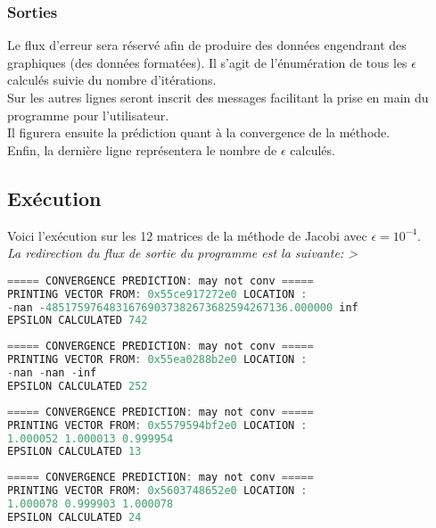 \subsubsection{Sorties}
Le flux d'erreur sera réservé afin de produire des données engendrant des graphiques (des données formatées). Il s'agit de l'énumération de tous les $\epsilon$ calculés suivie du nombre d'itérations. \\
Sur les autres lignes seront inscrit des messages facilitant la prise en main du programme pour l'utilisateur. \\
Il figurera ensuite la prédiction quant à la convergence de la méthode.\\
Enfin, la dernière ligne représentera le nombre de $\epsilon$ calculés. \\
\subsection{Exécution}
Voici l'exécution sur les 12 matrices de la méthode de Jacobi avec $\epsilon=10^{-4}$.\\
\textit{La redirection du flux de sortie du programme est la suivante: >}
\begin{lstlisting}[language=C,inputencoding=utf8, basicstyle=\fontsize{8}{10}\selectfont,caption=Execution with A1 matrix]
 ===== CONVERGENCE PREDICTION: may not conv =====
PRINTING VECTOR FROM: 0x55ce917272e0 LOCATION :
-nan -48517597648316769037382673682594267136.000000 inf
EPSILON CALCULATED 742
\end{lstlisting}
\begin{lstlisting}[language=C,inputencoding=utf8, basicstyle=\fontsize{8}{10}\selectfont,caption=Execution with A2 matrix]
 ===== CONVERGENCE PREDICTION: may not conv =====
PRINTING VECTOR FROM: 0x55ea0288b2e0 LOCATION :
-nan -nan -inf
EPSILON CALCULATED 252
\end{lstlisting}
\begin{lstlisting}[language=C,inputencoding=utf8, basicstyle=\fontsize{8}{10}\selectfont,caption=Execution with A3 matrix]
 ===== CONVERGENCE PREDICTION: may not conv =====
PRINTING VECTOR FROM: 0x5579594bf2e0 LOCATION :
1.000052 1.000013 0.999954
EPSILON CALCULATED 13
\end{lstlisting}
\begin{lstlisting}[language=C,inputencoding=utf8, basicstyle=\fontsize{8}{10}\selectfont,caption=Execution with A4 matrix]
 ===== CONVERGENCE PREDICTION: may not conv =====
PRINTING VECTOR FROM: 0x5603748652e0 LOCATION :
1.000078 0.999903 1.000078
EPSILON CALCULATED 24
\end{lstlisting}
